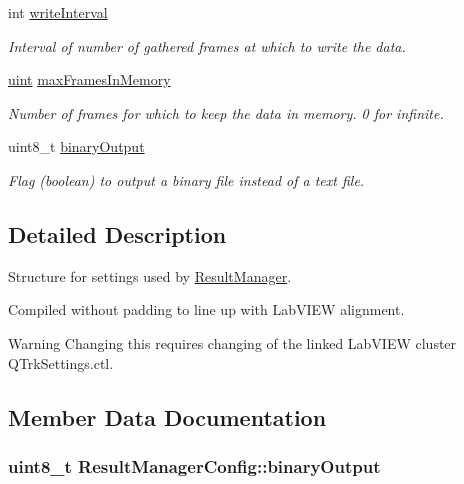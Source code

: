 \begin{DoxyCompactItemize}
int \hyperlink{struct_result_manager_config_a24c57e2403e5012fc5900924db770611}{write\+Interval}
\begin{DoxyCompactList}\small\item\em Interval of number of gathered frames at which to write the data. \end{DoxyCompactList}\item 
\hyperlink{std__incl_8h_a91ad9478d81a7aaf2593e8d9c3d06a14}{uint} \hyperlink{struct_result_manager_config_a11b7dd434bb6477aad45198b76593f59}{max\+Frames\+In\+Memory}
\begin{DoxyCompactList}\small\item\em Number of frames for which to keep the data in memory. 0 for infinite. \end{DoxyCompactList}\item 
uint8\+\_\+t \hyperlink{struct_result_manager_config_a292ca1e5db1a9599d5dc52e14e83c2eb}{binary\+Output}
\begin{DoxyCompactList}\small\item\em Flag (boolean) to output a binary file instead of a text file. \end{DoxyCompactList}\end{DoxyCompactItemize}


\subsection{Detailed Description}
Structure for settings used by \hyperlink{class_result_manager}{Result\+Manager}. 

Compiled without padding to line up with Lab\+V\+I\+EW alignment. \begin{DoxyWarning}{Warning}
Changing this requires changing of the linked Lab\+V\+I\+EW cluster Q\+Trk\+Settings.\+ctl. 
\end{DoxyWarning}


\subsection{Member Data Documentation}
\subsubsection[{\texorpdfstring{binary\+Output}{binaryOutput}}]{\setlength{\rightskip}{0pt plus 5cm}uint8\+\_\+t Result\+Manager\+Config\+::binary\+Output}\hypertarget{struct_result_manager_config_a292ca1e5db1a9599d5dc52e14e83c2eb}{}\label{struct_result_manager_config_a292ca1e5db1a9599d5dc52e14e83c2eb}


